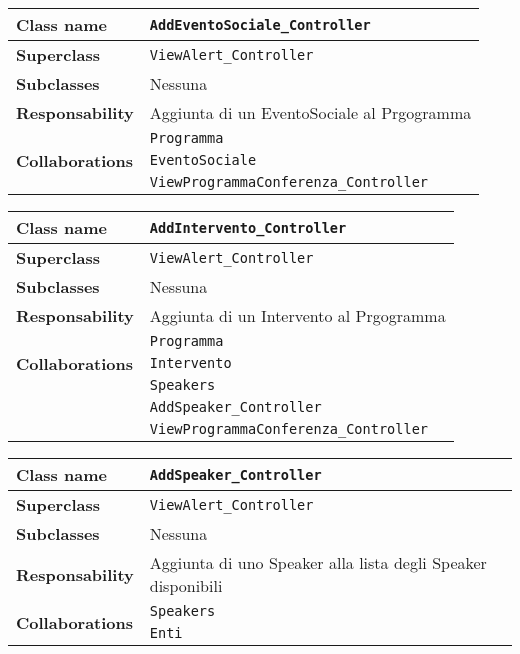 \begin{table}[h!]
	\begin{tabular}{|l|l|}
		\hline 
		\textbf{Class name} & \texttt{AddEventoSociale\_Controller}
		\\ \hline
		\textbf{Superclass} & \texttt{ViewAlert\_Controller}
		\\ \hline
		\multirow{1}{*}{\textbf{Subclasses}} & Nessuna
		\\ \hline
		\textbf{Responsability} & Aggiunta di un EventoSociale al Prgogramma
		\\ \hline
		\multirow{3}{*}{\textbf{Collaborations}} & \texttt{Programma }\\
		& \texttt{EventoSociale}\\
		& \texttt{ViewProgrammaConferenza\_Controller}
		\\ \hline
	\end{tabular}
\end{table}

\begin{table}[h!]
	\begin{tabular}{|l|l|}
		\hline 
		\textbf{Class name} & \texttt{AddIntervento\_Controller}
		\\ \hline
		\textbf{Superclass} & \texttt{ViewAlert\_Controller}
		\\ \hline
		\multirow{1}{*}{\textbf{Subclasses}} & Nessuna
		\\ \hline
		\textbf{Responsability} & Aggiunta di un Intervento al Prgogramma
		\\ \hline
		\multirow{3}{*}{\textbf{Collaborations}} & \texttt{Programma} \\
		& \texttt{Intervento}\\
		& \texttt{Speakers}\\
		& \texttt{AddSpeaker\_Controller}\\
		& \texttt{ViewProgrammaConferenza\_Controller}
		\\ \hline
	\end{tabular}
\end{table}

\begin{table}[h!]
	\begin{tabular}{|l|l|}
		\hline 
		\textbf{Class name} & \texttt{AddSpeaker\_Controller}
		\\ \hline
		\textbf{Superclass} & \texttt{ViewAlert\_Controller}
		\\ \hline
		\multirow{1}{*}{\textbf{Subclasses}} & Nessuna
		\\ \hline
		\textbf{Responsability} & Aggiunta di uno Speaker alla lista degli Speaker disponibili
		\\ \hline
		\multirow{2}{*}{\textbf{Collaborations}} & \texttt{Speakers} \\
		& \texttt{Enti}
		\\ \hline
	\end{tabular}
\end{table}
\clearpage
\pagebreak

